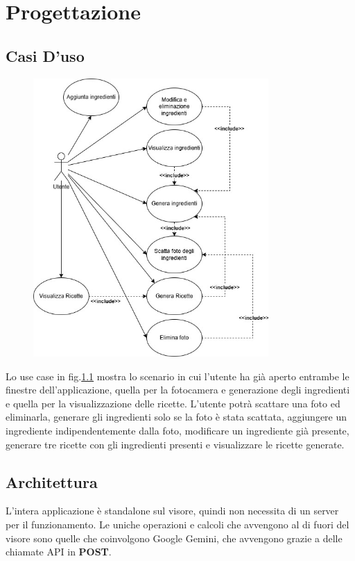 \chapter{Progettazione}
\pagestyle{plain}

\section{Casi D'uso}
\begin{figure}[H]
    \centering
    \includegraphics[width=0.8\textwidth,height=\textheight,keepaspectratio]{figures/chapter_1/use_case.jpg}
    \caption{}
    \label{fig:use_case}
\end{figure}

Lo use case in fig.\ref{fig:use_case} mostra lo scenario in cui l'utente ha già aperto entrambe le finestre dell'applicazione, quella per la fotocamera e generazione degli ingredienti e quella per la visualizzazione delle ricette. L'utente potrà scattare una foto ed eliminarla, generare gli ingredienti solo se la foto è stata scattata, aggiungere un ingrediente indipendentemente dalla foto, modificare un ingrediente già presente, generare tre ricette con gli ingredienti presenti e visualizzare le ricette generate.

\section{Architettura}
L'intera applicazione è standalone sul visore, quindi non necessita di un server per il funzionamento. Le uniche operazioni e calcoli che avvengono al di fuori del visore sono quelle che coinvolgono Google Gemini, che avvengono grazie a delle chiamate API in \textbf{POST}.
